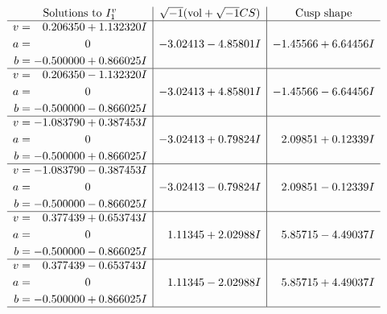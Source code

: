 \documentclass[1p]{elsarticle_modified}
\theoremstyle{definition}
\newcommand{\I}{\sqrt{-1}}
\begin{document}
$$\begin{array}{c|c|c}  
\text{Solutions to }I^v_{1}& \I (\text{vol} + \sqrt{-1}CS) & \text{Cusp shape}\\
 \hline 
\begin{aligned}
v &= \phantom{-}0.206350 + 1.132320 I \\
a &= \phantom{-0.000000 } 0 \\
b &= -0.500000 + 0.866025 I\end{aligned}
 & -3.02413 - 4.85801 I & -1.45566 + 6.64456 I \\ \hline\begin{aligned}
v &= \phantom{-}0.206350 - 1.132320 I \\
a &= \phantom{-0.000000 } 0 \\
b &= -0.500000 - 0.866025 I\end{aligned}
 & -3.02413 + 4.85801 I & -1.45566 - 6.64456 I \\ \hline\begin{aligned}
v &= -1.083790 + 0.387453 I \\
a &= \phantom{-0.000000 } 0 \\
b &= -0.500000 + 0.866025 I\end{aligned}
 & -3.02413 + 0.79824 I & \phantom{-}2.09851 + 0.12339 I \\ \hline\begin{aligned}
v &= -1.083790 - 0.387453 I \\
a &= \phantom{-0.000000 } 0 \\
b &= -0.500000 - 0.866025 I\end{aligned}
 & -3.02413 - 0.79824 I & \phantom{-}2.09851 - 0.12339 I \\ \hline\begin{aligned}
v &= \phantom{-}0.377439 + 0.653743 I \\
a &= \phantom{-0.000000 } 0 \\
b &= -0.500000 - 0.866025 I\end{aligned}
 & \phantom{-}1.11345 + 2.02988 I & \phantom{-}5.85715 - 4.49037 I \\ \hline\begin{aligned}
v &= \phantom{-}0.377439 - 0.653743 I \\
a &= \phantom{-0.000000 } 0 \\
b &= -0.500000 + 0.866025 I\end{aligned}
 & \phantom{-}1.11345 - 2.02988 I & \phantom{-}5.85715 + 4.49037 I\\
 \hline 
 \end{array}$$\newpage
\end{document}
